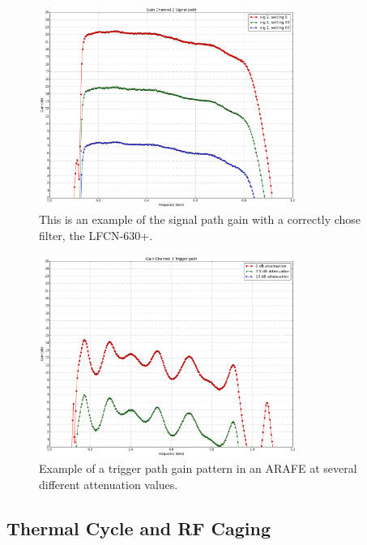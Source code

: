 \documentclass[letter,12pt]{article}
\begin{document}
\begin{figure}
\begin{centering}
\includegraphics[width=0.75\textwidth]{photos/RF4003_SIG2.png}
\par\end{centering}
\caption{This is an example of the signal path gain with a correctly chose  filter, the LFCN-630+.}
\label{sig2-example-LFCN630}
\end{figure}

\begin{figure}
\begin{centering}
\includegraphics[width=0.75\textwidth]{photos/RF4001_TRIG3.png}
\par\end{centering}
\caption{Example of a trigger path gain pattern in an ARAFE at several different attenuation values.}
\label{trig3-example}
\end{figure}

\subsection{Thermal Cycle and RF Caging}
\end{document}
